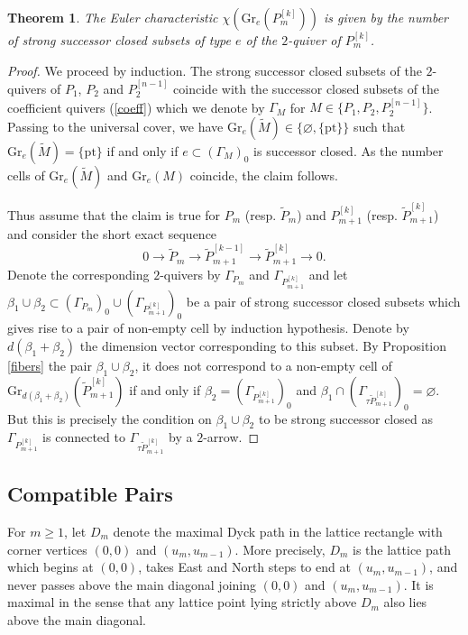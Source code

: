 \documentclass{amsart}
\newtheorem{theorem}{Theorem}[section]
\numberwithin{equation}{section}
\newcommand{\pt}{\mathrm{pt}}
\newcommand{\Gr}{\mathrm{Gr}}
\newcommand{\ses}[3]{0\rightarrow #1\rightarrow #2\rightarrow#3\rightarrow 0}
\begin{document}
\begin{theorem}
  The Euler characteristic $\chi(\Gr_e(P_m^{[k]}))$ is given by the number of strong successor closed subsets of type $e$ of the $2$-quiver of $P_m^{[k]}$.
\end{theorem}
\begin{proof}
  We proceed by induction.
  The strong successor closed subsets of the $2$-quivers of $P_1$, $P_2$ and $P_2^{[n-1]}$ coincide with the successor closed subsets of the coefficient quivers (\ref{coeff}) which we denote by $\Gamma_M$ for $M\in\{P_1, P_2,P_2^{[n-1]}\}$.
  Passing to the universal cover, we have $\Gr_e(\tilde M)\in\{\varnothing,\{\pt\}\}$ such that $\Gr_e(\tilde M)=\{\pt\}$ if and only if $e\subset (\Gamma_M)_0$ is successor closed.
  As the number cells of $\Gr_e(\tilde M)$ and $\Gr_e(M)$ coincide, the claim follows.

  Thus assume that the claim is true for $P_m$ (resp. $\tilde P_{m}$) and $P_{m+1}^{[k]}$ (resp. $\tilde P_{m+1}^{[k]}$) and consider the short exact sequence
  \[
    \ses{\tilde P_m}{\tilde P_{m+1}^{[k-1]}}{\tilde P_{m+1}^{[k]}}.
  \]
  Denote the corresponding $2$-quivers by $\Gamma_{P_m}$ and $\Gamma_{P_{m+1}^{[k]}}$ and let $\beta_1\cup\beta_2\subset (\Gamma_{P_m})_0\cup (\Gamma_{P_{m+1}^{[k]}})_0$ be a pair of strong successor closed subsets which gives rise to a pair of non-empty cell by induction hypothesis.
  Denote by $d(\beta_1+\beta_2)$ the dimension vector corresponding to this subset.
  By Proposition \ref{fibers} the pair $\beta_1\cup\beta_2$, it does not correspond to a non-empty cell of $\Gr_{d(\beta_1+\beta_2)}(\tilde P_{m+1}^{[k]})$ if and only if $\beta_2=(\Gamma_{P_{m+1}^{[k]}})_0$ and $\beta_1\cap(\Gamma_{\tau\tilde P_{m+1}^{[k]}})_0=\varnothing$.
  But this is precisely the condition on $\beta_1\cup\beta_2$ to be strong successor closed as $\Gamma_{P_{m+1}^{[k]}}$ is connected to $\Gamma_{\tau\tilde P_{m+1}^{[k]}}$ by a $2$-arrow.
\end{proof}


\subsection{Compatible Pairs}
For $m\ge1$, let $D_m$ denote the maximal Dyck path in the lattice rectangle with corner vertices $(0,0)$ and $(u_m,u_{m-1})$.  
More precisely, $D_m$ is the lattice path which begins at $(0,0)$, takes East and North steps to end at $(u_m,u_{m-1})$, and never passes above the main diagonal joining $(0,0)$ and $(u_m,u_{m-1})$.  
It is maximal in the sense that any lattice point lying strictly above $D_m$ also lies above the main diagonal.  
\end{document}
